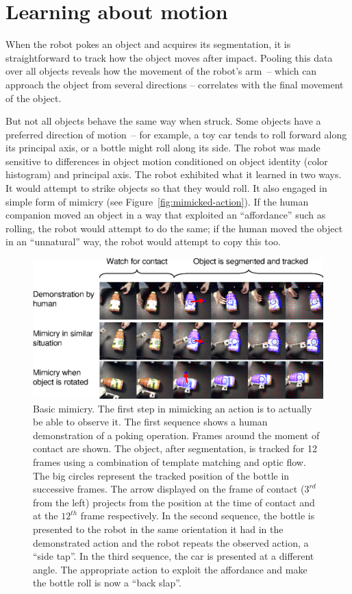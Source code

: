 
\section{Learning about motion}

When the robot pokes an object and acquires its segmentation,
it is straightforward to track how the object moves after impact.
%
Pooling this data over all objects reveals how the movement of the
robot's arm~-- which can approach the object from several directions
-- correlates with the final movement of the object.

But not all objects behave the same way when struck.  
Some objects have a preferred direction of motion~-- for example,
a toy car tends to roll forward along its principal axis,
or a bottle might roll along its side.
%
The robot was made sensitive to differences in object motion
conditioned on object identity (color histogram) and principal axis.
The robot exhibited what it learned in two ways.  It would 
attempt to strike objects so that they would roll.
It also engaged in
simple form of mimicry (see Figure~\ref{fig:mimicked-action}).
If the human companion moved an object in a way that
exploited an ``affordance'' such as rolling, 
the robot would attempt to do the same; if the human moved the
object in an ``unnatural'' way, the robot would attempt to
copy this too.

\ifnote
\begin{figure}[tb]
\begin{center}
\includegraphics[width=\columnwidth]{fig-mimicry-bottle}
\caption{ 
\label{fig:observed-action}
%
Basic mimicry.  The first step in mimicking an action is to actually
be able to observe it.  The first sequence shows a human demonstration
of a poking operation.  Frames around the moment of contact are shown.
The object, after segmentation, is tracked for 12 frames using a
combination of template matching and optic flow.  The big circles
represent the tracked position of the bottle in successive frames.
The arrow displayed on the frame of contact ($3^{rd}$ from the left)
projects from the position at the time of contact and at the $12^{th}$
frame respectively.
%
In the second sequence, the bottle is presented to the robot in the
same orientation it had in the demonstrated action and the robot
repeats the observed action, a ``side tap''.  In the third sequence,
the car is presented at a different angle.  The appropriate action to
exploit the affordance and make the bottle roll is now a ``back
slap''.
%
}
\end{center}
\end{figure}
\fi

